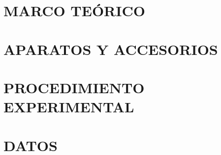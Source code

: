 \documentclass[10pt]{article}
\begin{document}
\section{MARCO TEÓRICO}



\blindmathpaper %

\newpage
\setcounter{equation}{0} %
\setcounter{figure}{0} %
\setcounter{table}{0} %
\section{APARATOS Y ACCESORIOS}



\blindmathpaper %


\newpage
\setcounter{equation}{0} %
\setcounter{figure}{0} %
\setcounter{table}{0} %
\section{PROCEDIMIENTO EXPERIMENTAL}



\blindmathpaper %


\newpage
\setcounter{equation}{0} %
\setcounter{figure}{0} %
\setcounter{table}{0} %
\section{DATOS}
\end{document}
